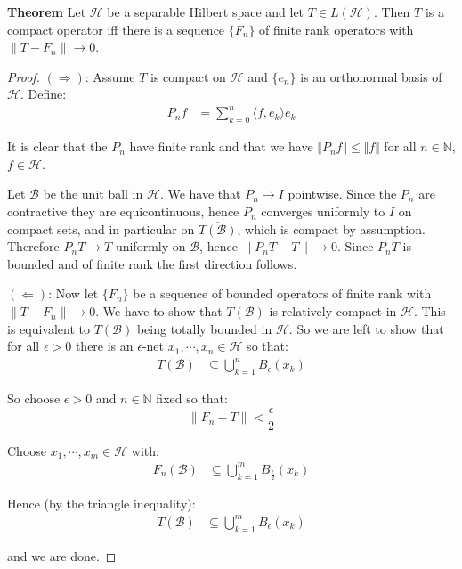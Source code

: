 \documentclass[12pt]{article}
\newcommand{\scal}[2]{\langle #1, #2 \rangle}
\begin{document}
\textbf{Theorem} Let $\mathcal{H}$ be a separable Hilbert space and let $T \in L(\mathcal{H})$. Then $T$ is a compact operator iff there is a sequence $\{F_n\}$ of finite rank operators with $\|T - F_n\| \to 0$.

\begin{proof}
$(\Rightarrow)$: Assume $T$ is compact on $\mathcal{H}$ and $\{e_n\}$ is an orthonormal basis of $\mathcal{H}$. Define:
\begin{align*}
P_n f &= \sum_{k=0}^n \scal{f}{e_k} e_k 
\end{align*}

It is clear that the $P_n$ have finite rank and that we have $\Vert P_n f\Vert \leq \Vert f\Vert$ for all $n \in \mathbb{N}$, $f \in \mathcal{H}$. 

Let $\mathcal{B}$ be the unit ball in $\mathcal{H}$. We have that $P_n \to I$ pointwise. Since the $P_n$ are contractive they are equicontinuous, hence $P_n$ converges uniformly to $I$ on compact sets, and in particular on $ \overline{T(\mathcal{B})}$, which is compact by assumption.
Therefore $P_n T \to T$ uniformly on $\mathcal{B}$, hence $\|P_n T - T\| \to 0$. 
Since $P_n T$ is bounded and of finite rank the first direction follows.

$(\Leftarrow)$: Now let $\{F_n\}$ be a sequence of bounded operators of finite rank with $\|T - F_n\| \to 0$. 
We have to show that $T(\mathcal{B})$ is relatively compact in $\mathcal{H}$. This is equivalent to $T(\mathcal{B})$ being totally bounded in $\mathcal{H}$.
So we are left to show that for all $\epsilon > 0$ there is an $\epsilon$-net $x_1, \cdots, x_n \in \mathcal{H}$ so that:
\begin{align*}
T(\mathcal{B}) &\subseteq \bigcup_{k=1}^n B_{\epsilon}(x_k)
\end{align*}

So choose $\epsilon > 0$ and $n \in \mathbb{N}$ fixed so that:
\begin{displaymath}
\|F_n - T\| < \frac{\epsilon}{2}
\end{displaymath}

Choose $x_1, \cdots, x_m \in \mathcal{H}$ with:
\begin{align*}
F_n(\mathcal{B}) &\subseteq \bigcup_{k=1}^m B_{\frac{\epsilon}{2}}(x_k)
\end{align*}

Hence (by the triangle inequality):
\begin{align*}
T(\mathcal{B}) &\subseteq \bigcup_{k=1}^m B_{\epsilon}(x_k)
\end{align*}

and we are done. 
\end{proof}
\end{document}
